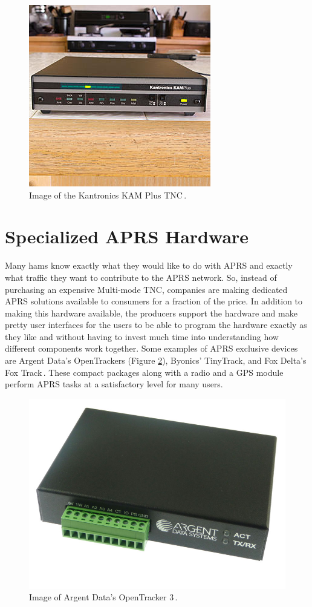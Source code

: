 \begin{figure}
  \centering
	\includegraphics[width=0.75\linewidth]{images/Kantronics-KAM-Plus.jpg} 
	\caption{Image of the Kantronics KAM Plus TNC\,\cite{KK6RF}.}
   \label{kantronicsKamPlus}
\end{figure}

\section{Specialized APRS Hardware}
Many hams know exactly what they would like to do with APRS and exactly what traffic they want to contribute to the APRS network. So, instead of purchasing an expensive Multi-mode TNC, companies are making dedicated APRS solutions available to consumers for a fraction of the price. In addition to making this hardware available, the producers support the hardware and make pretty user interfaces for the users to be able to program the hardware exactly as they like and without having to invest much time into understanding how different components work together. Some examples of APRS exclusive devices are Argent Data's OpenTrackers (Figure \ref{openTracker3}), Byonics' TinyTrack, and Fox Delta's Fox Track\,\cite{Miller,Byonics,Foxtrak}. These compact packages along with a radio and a GPS module perform APRS tasks at a satisfactory level for many users.

\begin{figure}
  \centering
	\includegraphics[width=0.75\linewidth]{images/Ot3m-termblk.jpg} 
	\caption{Image of Argent Data's OpenTracker 3\,\cite{Data}.}
   \label{openTracker3}
\end{figure}

